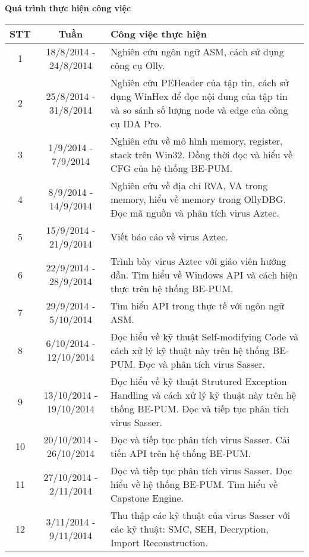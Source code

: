 \newpage
\begin{Large}
\textbf{Quá trình thực hiện công việc}
\end{Large}

\vspace{2cm}

\setlength\tabcolsep{10pt}
\begin{center}
\begin{longtable}{|c|c|p{8cm}|}
\hline
\textbf{STT}		& \textbf{Tuần}					& \textbf{Công việc thực hiện}	\\
\hline
1					& 18/8/2014 - 24/8/2014			& Nghiên cứu ngôn ngữ ASM, cách sử dụng công cụ Olly.\\
\hline
2					& 25/8/2014 - 31/8/2014			&  Nghiên cứu PEHeader của tập tin, cách sử dụng WinHex để đọc nội dung của tập tin và so sánh số lượng node và edge của công cụ IDA Pro.\\
\hline
3					& 1/9/2014 - 7/9/2014			& Nghiên cứu về mô hình memory, register, stack trên Win32. Đồng thời đọc và hiểu về CFG của hệ thống BE-PUM.\\
\hline
4					& 8/9/2014 - 14/9/2014			& Nghiên cứu về địa chỉ RVA, VA trong memory, hiểu về memory trong OllyDBG. Đọc mã nguồn và phân tích virus Aztec.\\
\hline
5					& 15/9/2014 - 21/9/2014			& Viết báo cáo về virus Aztec.\\
\hline
6					& 22/9/2014 - 28/9/2014			& Trình bày virus Aztec với giáo viên hướng dẫn. Tìm hiểu về Windows API và cách hiện thực trên hệ thống BE-PUM.\\
\hline
7					& 29/9/2014 - 5/10/2014			&  Tìm hiểu API trong thực tế với ngôn ngữ ASM.\\
\hline
8					& 6/10/2014 - 12/10/2014		& Đọc hiểu về kỹ thuật Self-modifying Code và cách xử lý kỹ thuật này trên hệ thống BE-PUM. Đọc và phân tích virus Sasser.\\	
\hline
9					& 13/10/2014 - 19/10/2014		& Đọc hiểu về kỹ thuật Strutured Exception Handling và cách xử lý kỹ thuật này trên hệ thống BE-PUM. Đọc và tiếp tục phân tích virus Sasser.\\	
\hline
10					& 20/10/2014 - 26/10/2014		& Đọc và tiếp tục phân tích virus Sasser. Cải tiến API trên hệ thống BE-PUM.\\	
\hline
11					& 27/10/2014 - 2/11/2014		& Đọc và tiếp tục phân tích virus Sasser. Đọc hiểu về hệ thống BE-PUM. Tìm hiểu về Capstone Engine.\\	
\hline
12					& 3/11/2014 - 9/11/2014			& Thu thập các kỹ thuật của virus Sasser với các kỹ thuật: SMC, SEH, Decryption, Import Reconstruction.\\	

\end{longtable}
\end{center}
